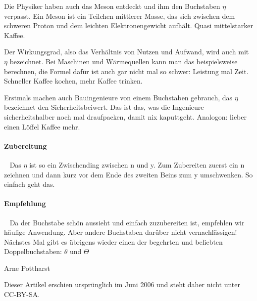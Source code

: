 {    Die Physiker haben auch das Meson entdeckt und ihm den Buchstaben $\eta$ verpasst.
    Ein Meson ist ein Teilchen mittlerer Masse, das sich zwischen dem schweren
    Proton und dem leichten Elektronengewicht aufhält. Quasi mittelstarker Kaffee.

    Der Wirkungsgrad, also das Verhältnis von Nutzen und Aufwand, wird auch mit
    $\eta$
    bezeichnet. Bei Maschinen und Wärmequellen kann man das beispielsweise
    berechnen, die Formel dafür ist auch gar nicht mal so schwer: Leistung mal
    Zeit. Schneller Kaffee kochen, mehr Kaffee trinken.

    Erstmals machen auch Bauingenieure von einem Buchstaben gebrauch, das $\eta$
    bezeichnet den Sicherheitsbeiwert. Das ist das, was die Ingenieure
    sicherheitshalber noch mal draufpacken, damit nix kaputtgeht. Analogon: lieber
    einen Löffel Kaffee mehr.
    \paragraph{Zubereitung}~\newline
    Das $\eta$ ist so ein Zwischending zwischen n und y. Zum Zubereiten zuerst ein n
    zeichnen und dann kurz vor dem Ende des zweiten Beins zum y umschwenken. So
    einfach geht das.
    \paragraph{Empfehlung}~\newline
    Da der Buchstabe schön aussieht und einfach zuzubereiten ist, empfehlen wir
    häufige Anwendung. Aber andere Buchstaben darüber nicht vernachlässigen!
    Nächstes Mal gibt es übrigens wieder einen der begehrten und beliebten
    Doppelbuchstaben: $\theta$ und $\Theta$}
{Arne Pottharst}


Dieser Artikel erschien ursprünglich im Juni 2006 und steht daher nicht unter
CC-BY-SA.
